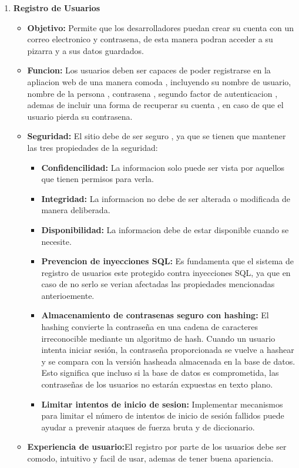 \documentclass[a4paper, oneside, final]{scrartcl}
\begin{document}
\begin{enumerate}
\item \textbf{Registro de Usuarios} %
  \begin{itemize}
  \item \textbf{Objetivo:} Permite que los desarrolladores puedan crear su cuenta con un correo electronico y contrasena, de esta manera podran acceder a su pizarra y a sus datos guardados.
  \item \textbf{Funcion:} Los usuarios deben ser capaces de poder registrarse en la apliacion web de una manera comoda , incluyendo su nombre de usuario, nombre de la persona , contrasena , segundo factor de autenticacion , ademas de incluir una forma de recuperar su cuenta , en caso de que el usuario pierda su contrasena.
  \item \textbf{Seguridad:} El sitio debe de ser seguro , ya que se tienen que mantener las tres propiedades de la seguridad:
    \begin{itemize}
    \item \textbf{Confidencilidad:} La informacion solo puede ser vista por aquellos que tienen permisos para verla.
    \item \textbf{Integridad:} La informacion no debe de ser alterada o modificada de manera deliberada.
    \item \textbf{Disponibilidad:} La informacion debe de estar disponible cuando se necesite.
    \end{itemize}
    \begin{itemize}
    \item \textbf{Prevencion de inyecciones SQL:} Es fundamenta que el sistema de registro de usuarios este protegido contra inyecciones SQL, ya que en caso de no serlo se verian afectadas las propiedades mencionadas anterioemente.
    \item \textbf{Almacenamiento de contrasenas seguro con hashing:} El hashing convierte la contraseña en una cadena de caracteres irreconocible mediante un algoritmo de hash. Cuando un usuario intenta iniciar sesión, la contraseña proporcionada se vuelve a hashear y se compara con la versión hasheada almacenada en la base de datos. Esto significa que incluso si la base de datos es comprometida, las contraseñas de los usuarios no estarán expuestas en texto plano.
    \item \textbf{Limitar intentos de inicio de sesion:} Implementar mecanismos para limitar el número de intentos de inicio de sesión fallidos puede ayudar a prevenir ataques de fuerza bruta y de diccionario.
    \end{itemize}
  \item \textbf{Experiencia de usuario:}El registro por parte de los usuarios debe ser comodo, intuitivo y facil de usar, ademas de tener buena apariencia.
  \end{itemize}



\end{enumerate}
\end{document}
